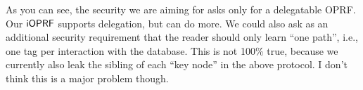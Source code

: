 As you can see, the security we are aiming for asks only for a
delegatable OPRF. Our $\mathsf{i}\mathsf{OPRF}$ supports delegation, but can do more. We
could also ask as an additional security requirement that the reader
should only learn ``one path'', i.e., one tag per interaction with the
database. This is not 100\% true, because we currently also leak the
sibling of each ``key node'' in the above protocol. I don't think this
is a major problem though.

